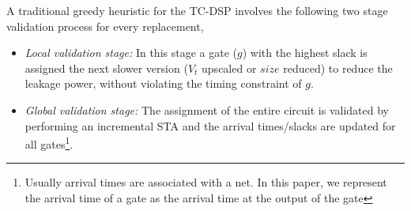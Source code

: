 









\noindent A traditional greedy heuristic for the TC-DSP involves the following two stage validation process for every replacement,
\begin{itemize}
\item {\it Local validation stage:} In this stage a gate ($g$) with the highest slack is assigned the next slower version ($V_t$ upscaled or $size$ reduced) to reduce the leakage power, without violating the timing constraint of $g$.
\item {\it Global validation stage:} The assignment of the entire circuit is validated by performing an incremental STA  and the arrival times/slacks are updated for all gates\footnote{Usually arrival times are associated with a net. 
In this paper, we represent the arrival time of a gate as the arrival time at the output of the gate}.
\end{itemize} 


